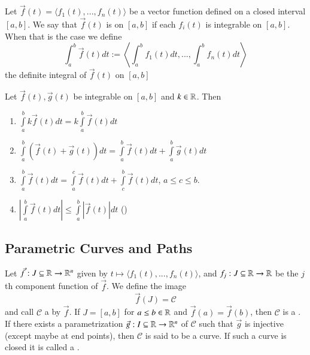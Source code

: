 \documentclass[12pt, a4paper, oneside, openright, titlepage]{book}
\begin{document}
\begin{appendices}
    \begin{defn}
        Let $\vec{f}(t) = \langle f_1(t),...,f_n(t)\rangle$ be a vector function defined on a closed interval $[a,b]$. We say that $\vec{f}(t)$ is  on $[a,b]$ if each $f_i(t)$ is integrable on $[a,b]$. When that is the case we define \begin{equation}
            \int_a^b\vec{f}(t)dt := \left\langle \int_a^bf_1(t)dt,...,\int_a^bf_n(t)dt\right\rangle
        \end{equation}
        the definite integral of $\vec{f}(t)$ on $[a,b]$
    \end{defn}


    \begin{rmk}[Properties]
        Let $\vec{f}(t),\vec{g}(t)$ be integrable on $[a,b]$ and $k \in \mathbb R$. Then \begin{enumerate}
            \item $\int\limits_a^bk\vec{f}(t)dt = k\int\limits_a^b\vec{f}(t)dt$
            \item $\int\limits_a^b(\vec{f}(t)+\vec{g}(t))dt = \int\limits_a^b\vec{f}(t)dt + \int\limits_a^b\vec{g}(t)dt$
            \item $\int\limits_a^b\vec{f}(t)dt = \int\limits_a^c\vec{f}(t)dt + \int\limits_c^b\vec{f}(t)dt$, $a \leq c \leq b$.
            \item $\left|\int\limits_a^b\vec{f}(t)dt\right| \leq \int\limits_a^b\left|\vec{f}(t)\right|dt$ ()
        \end{enumerate}
    \end{rmk}


    \subsection{Parametric Curves and Paths}

    \begin{defn}
        Let $\vec{f}:J\subseteq \mathbb R\rightarrow \mathbb R^n$ given by $t \mapsto \langle f_1(t),..., f_n(t)\rangle$, and $f_j: J\subseteq \mathbb R\rightarrow \mathbb R$ be the $j$th component function of $\vec{f}$. We define the image \begin{equation}
            \vec{f}(J) = \mathscr{C}
        \end{equation}
        and call $\mathscr{C}$ a  by $\vec{f}$. If $J = [a,b]$ for $a \leq b \in \mathbb R$ and $\vec{f}(a) = \vec{f}(b)$, then $\mathscr{C}$ is a . If there exists a parametrization $\vec{g}:I \subseteq \mathbb R \rightarrow \mathbb R^n$ of $\mathscr{C}$ such that $\vec{g}$ is injective (except maybe at end points), then $\mathscr{C}$ is said to be a  curve. If such a curve is closed it is called a .
    \end{defn}


\end{appendices}
\end{document}
